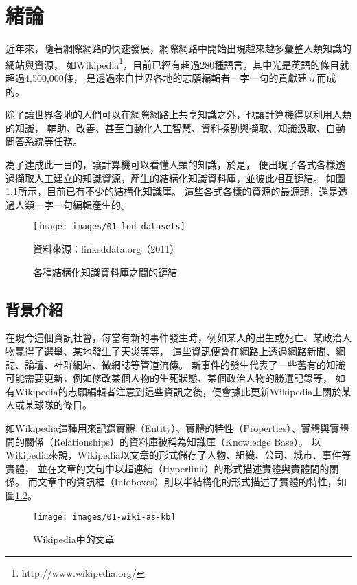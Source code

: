 %
%
%
\chapter{緒論}
\label{c:intro}

近年來，隨著網際網路的快速發展，網際網路中開始出現越來越多彙整人類知識的網站與資源，
如Wikipedia\footnote{http://www.wikipedia.org/}，目前已經有超過280種語言，其中光是英語的條目就超過4,500,000條，
是透過來自世界各地的志願編輯者一字一句的貢獻建立而成的。

除了讓世界各地的人們可以在網際網路上共享知識之外，也讓計算機得以利用人類的知識，
輔助、改善、甚至自動化人工智慧、資料探勘與擷取、知識汲取、自動問答系統等任務。

為了達成此一目的，讓計算機可以看懂人類的知識，於是，
便出現了各式各樣透過擷取人工建立的知識資源，產生的結構化知識資料庫，並彼此相互鏈結。
如圖\ref{i:lod}所示，目前已有不少的結構化知識庫。
這些各式各樣的資源的最源頭，還是透過人類一字一句編輯產生的。%

\begin{figure}
\centering
\texttt{[image: images/01-lod-datasets]}
\caption{各種結構化知識資料庫之間的鏈結}
\label{i:lod}
資料來源：linkeddata.org（2011）
\end{figure}

%
%
\section{背景介紹}
在現今這個資訊社會，每當有新的事件發生時，例如某人的出生或死亡、某政治人物贏得了選舉、某地發生了天災等等，
這些資訊便會在網路上透過網路新聞、網誌、論壇、社群網站、微網誌等管道流傳。
新事件的發生代表了一些舊有的知識可能需要更新，例如修改某個人物的生死狀態、某個政治人物的勝選記錄等，
如有Wikipedia的志願編輯者注意到這些資訊之後，便會據此更新Wikipedia上關於某人或某球隊的條目。

如Wikipedia這種用來記錄實體（Entity）、實體的特性（Properties）、實體與實體間的關係（Relationships）的資料庫被稱為知識庫（Knowledge Base）。
以Wikipedia來說，Wikipedia以文章的形式儲存了人物、組織、公司、城市、事件等實體，
並在文章的文句中以超連結（Hyperlink）的形式描述實體與實體間的關係。
而文章中的資訊框（Infoboxes）則以半結構化的形式描述了實體的特性，如圖\ref{i:wiki}。

\begin{figure}
\centering
\texttt{[image: images/01-wiki-as-kb]}
\caption{Wikipedia中的文章}
\label{i:wiki}
\end{figure}

